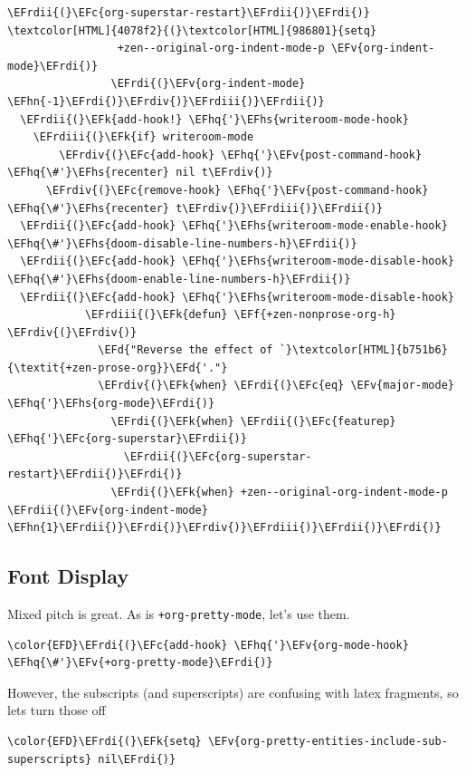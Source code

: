 \documentclass{scrartcl}
\newcommand{\EFk}[1]{\textcolor{EFk}{#1}} %
\newcommand{\EFd}[1]{\textcolor{EFd}{\textit{#1}}} %
\newcommand{\EFc}[1]{\textcolor{EFc}{#1}} %
\newcommand{\EFv}[1]{\textcolor{EFv}{#1}} %
\newcommand{\EFf}[1]{\textcolor{EFf}{#1}} %
\newcommand{\EFhn}[1]{\textcolor{EFhn}{\textbf{#1}}} %
\newcommand{\EFhq}[1]{\textcolor{EFhq}{#1}} %
\newcommand{\EFhs}[1]{\textcolor{EFhs}{#1}} %
\newcommand{\EFrdi}[1]{\textcolor{EFrdi}{#1}} %
\newcommand{\EFrdii}[1]{\textcolor{EFrdii}{#1}} %
\newcommand{\EFrdiii}[1]{\textcolor{EFrdiii}{#1}} %
\newcommand{\EFrdiv}[1]{\textcolor{EFrdiv}{#1}} %
\begin{document}
\begin{Code}
\begin{Verbatim}[]
                  \EFrdii{(}\EFc{org-superstar-restart}\EFrdii{)}\EFrdi{)}               \textcolor[HTML]{4078f2}{(}\textcolor[HTML]{986801}{setq}
                 +zen--original-org-indent-mode-p \EFv{org-indent-mode}\EFrdi{)}
                \EFrdi{(}\EFv{org-indent-mode} \EFhn{-1}\EFrdi{)}\EFrdiv{)}\EFrdiii{)}\EFrdii{)}
  \EFrdii{(}\EFk{add-hook!} \EFhq{'}\EFhs{writeroom-mode-hook}
    \EFrdiii{(}\EFk{if} writeroom-mode
        \EFrdiv{(}\EFc{add-hook} \EFhq{'}\EFv{post-command-hook} \EFhq{\#'}\EFhs{recenter} nil t\EFrdiv{)}
      \EFrdiv{(}\EFc{remove-hook} \EFhq{'}\EFv{post-command-hook} \EFhq{\#'}\EFhs{recenter} t\EFrdiv{)}\EFrdiii{)}\EFrdii{)}
  \EFrdii{(}\EFc{add-hook} \EFhq{'}\EFhs{writeroom-mode-enable-hook} \EFhq{\#'}\EFhs{doom-disable-line-numbers-h}\EFrdii{)}
  \EFrdii{(}\EFc{add-hook} \EFhq{'}\EFhs{writeroom-mode-disable-hook} \EFhq{\#'}\EFhs{doom-enable-line-numbers-h}\EFrdii{)}
  \EFrdii{(}\EFc{add-hook} \EFhq{'}\EFhs{writeroom-mode-disable-hook}
            \EFrdiii{(}\EFk{defun} \EFf{+zen-nonprose-org-h} \EFrdiv{(}\EFrdiv{)}
              \EFd{"Reverse the effect of `}\textcolor[HTML]{b751b6}{\textit{+zen-prose-org}}\EFd{'."}
              \EFrdiv{(}\EFk{when} \EFrdi{(}\EFc{eq} \EFv{major-mode} \EFhq{'}\EFhs{org-mode}\EFrdi{)}
                \EFrdi{(}\EFk{when} \EFrdii{(}\EFc{featurep} \EFhq{'}\EFc{org-superstar}\EFrdii{)}
                  \EFrdii{(}\EFc{org-superstar-restart}\EFrdii{)}\EFrdi{)}
                \EFrdi{(}\EFk{when} +zen--original-org-indent-mode-p \EFrdii{(}\EFv{org-indent-mode} \EFhn{1}\EFrdii{)}\EFrdi{)}\EFrdiv{)}\EFrdiii{)}\EFrdii{)}\EFrdi{)}
\end{Verbatim}
\end{Code}

\subsection{Font Display}
\label{sec:orgffb8f3f}
Mixed pitch is great. As is \texttt{+org-pretty-mode}, let's use them.
\begin{Code}
\begin{Verbatim}[]
\color{EFD}\EFrdi{(}\EFc{add-hook} \EFhq{'}\EFv{org-mode-hook} \EFhq{\#'}\EFv{+org-pretty-mode}\EFrdi{)}
\end{Verbatim}
\end{Code}

However, the subscripts (and superscripts) are confusing with latex fragments,
so lets turn those off
\begin{Code}
\begin{Verbatim}[]
\color{EFD}\EFrdi{(}\EFk{setq} \EFv{org-pretty-entities-include-sub-superscripts} nil\EFrdi{)}
\end{Verbatim}
\end{Code}
\end{document}
